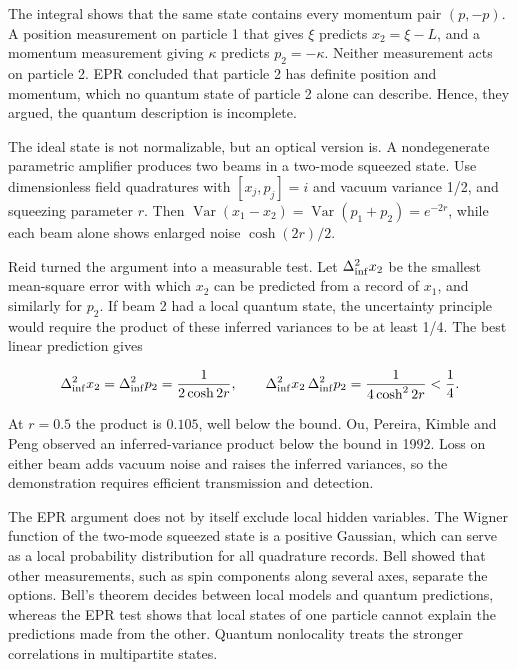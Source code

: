 \documentclass[11pt,oneside]{book}
\newenvironment{centeredalign}{\[\begin{gathered}[c]}{\end{gathered}\]}
\begin{document}
The integral shows that the same state contains every momentum pair \((p,-p)\). A position measurement on particle 1 that gives \(\xi\) predicts \(x_2=\xi-L\), and a momentum measurement giving \(\kappa\) predicts \(p_2=-\kappa\). Neither measurement acts on particle 2. EPR concluded that particle 2 has definite position and momentum, which no quantum state of particle 2 alone can describe. Hence, they argued, the quantum description is incomplete.

The ideal state is not normalizable, but an optical version is. A nondegenerate parametric amplifier produces two beams in a two-mode squeezed state. Use dimensionless field quadratures with \([x_j,p_j]=i\) and vacuum variance 1/2, and squeezing parameter \(r\). Then \(\operatorname{Var}(x_1-x_2)=\operatorname{Var}(p_1+p_2)=e^{-2r}\), while each beam alone shows enlarged noise \(\cosh(2r)/2\).

Reid turned the argument into a measurable test. Let \(\Delta^2_{\rm inf}x_2\) be the smallest mean-square error with which \(x_2\) can be predicted from a record of \(x_1\), and similarly for \(p_2\). If beam 2 had a local quantum state, the uncertainty principle would require the product of these inferred variances to be at least 1/4. The best linear prediction gives

\begin{centeredalign}
\Delta^2_{\rm inf}x_2=\Delta^2_{\rm inf}p_2=\frac{1}{2\cosh2r},\qquad
\Delta^2_{\rm inf}x_2\,\Delta^2_{\rm inf}p_2=\frac{1}{4\cosh^22r}<\frac14.
\end{centeredalign}

At \(r=0.5\) the product is \(0.105\), well below the bound. Ou, Pereira, Kimble and Peng observed an inferred-variance product below the bound in 1992. Loss on either beam adds vacuum noise and raises the inferred variances, so the demonstration requires efficient transmission and detection.

The EPR argument does not by itself exclude local hidden variables. The Wigner function of the two-mode squeezed state is a positive Gaussian, which can serve as a local probability distribution for all quadrature records. Bell showed that other measurements, such as spin components along several axes, separate the options. Bell's theorem decides between local models and quantum predictions, whereas the EPR test shows that local states of one particle cannot explain the predictions made from the other. Quantum nonlocality treats the stronger correlations in multipartite states.
\end{document}
